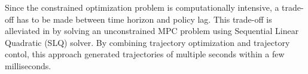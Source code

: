 Since the constrained optimization problem is computationally intensive, a trade-off has to be made between time horizon and policy lag. This trade-off is alleviated in \cite{neunert2016fast} by solving an unconstrained MPC problem using Sequential Linear Quadratic (SLQ) solver. By combining trajectory optimization and trajectory contol, this approach generated trajectories of multiple seconds within a few milliseconds.


















